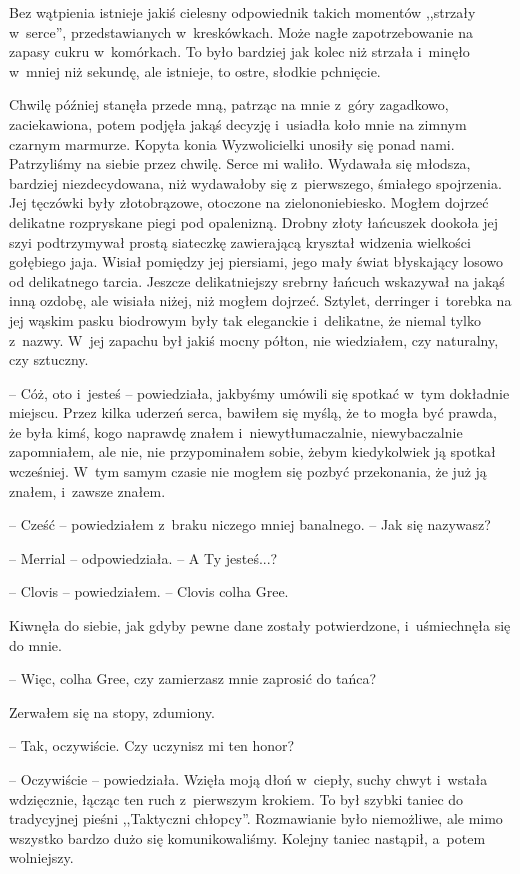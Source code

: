 \documentclass[oneside,polish,11pt,sfheadings]{mwbk}
\begin{document}
Bez wątpienia istnieje jakiś cielesny odpowiednik takich momentów
,,strzały w~serce'', przedstawianych w~kreskówkach. Może nagłe
zapotrzebowanie na zapasy cukru w~komórkach. To było bardziej jak kolec
niż strzała i~minęło w~mniej niż sekundę, ale istnieje, to ostre, słodkie
pchnięcie.

Chwilę później stanęła przede mną, patrząc na mnie z~góry zagadkowo,
zaciekawiona, potem podjęła jakąś decyzję i~usiadła koło mnie na zimnym
czarnym marmurze. Kopyta konia Wyzwolicielki unosiły się ponad nami.
Patrzyliśmy na siebie przez chwilę. Serce mi waliło. Wydawała się
młodsza, bardziej niezdecydowana, niż wydawałoby się z~pierwszego,
śmiałego spojrzenia. Jej tęczówki były złotobrązowe, otoczone na
zielono\dywiz niebiesko. Mogłem dojrzeć delikatne rozpryskane piegi pod
opalenizną. Drobny złoty łańcuszek dookoła jej szyi podtrzymywał prostą
siateczkę zawierającą kryształ widzenia wielkości gołębiego jaja. Wisiał
pomiędzy jej piersiami, jego mały świat błyskający losowo od delikatnego
tarcia. Jeszcze delikatniejszy srebrny łańcuch wskazywał na jakąś inną
ozdobę, ale wisiała niżej, niż mogłem dojrzeć. Sztylet, derringer i~torebka na jej wąskim pasku biodrowym były tak eleganckie i~delikatne,
że niemal tylko z~nazwy. W~jej zapachu był jakiś mocny półton, nie
wiedziałem, czy naturalny, czy sztuczny.

-- Cóż, oto i~jesteś -- powiedziała, jakbyśmy umówili się spotkać w~tym
dokładnie miejscu. Przez kilka uderzeń serca, bawiłem się myślą, że to
mogła być prawda, że była kimś, kogo naprawdę znałem i~niewytłumaczalnie, niewybaczalnie zapomniałem, ale nie, nie
przypominałem sobie, żebym kiedykolwiek ją spotkał wcześniej. W~tym
samym czasie nie mogłem się pozbyć przekonania, że już ją znałem, i~zawsze znałem.

-- Cześć -- powiedziałem z~braku niczego mniej banalnego. -- Jak się
nazywasz?

-- Merrial -- odpowiedziała. -- A Ty jesteś...?

-- Clovis -- powiedziałem. -- Clovis colha Gree.

Kiwnęła do siebie, jak gdyby pewne dane zostały potwierdzone, i~uśmiechnęła się do mnie.

-- Więc, colha Gree, czy zamierzasz mnie zaprosić do tańca?

Zerwałem się na stopy, zdumiony. 

-- Tak, oczywiście. Czy uczynisz mi ten
honor?

-- Oczywiście -- powiedziała. Wzięła moją dłoń w~ciepły, suchy chwyt i~wstała wdzięcznie, łącząc ten ruch z~pierwszym krokiem. To był szybki
taniec do tradycyjnej pieśni ,,Taktyczni chłopcy''. Rozmawianie było
niemożliwe, ale mimo wszystko bardzo dużo się komunikowaliśmy. Kolejny
taniec nastąpił, a~potem wolniejszy.
\end{document}
